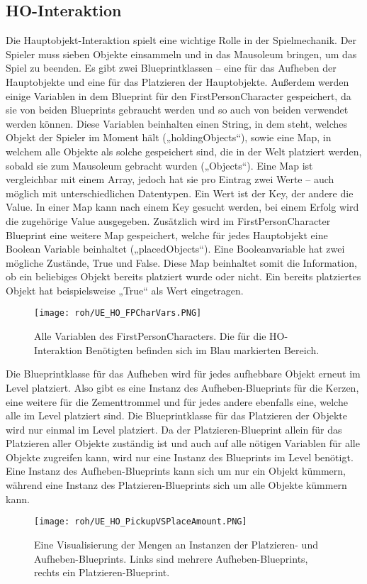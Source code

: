 \subsection{HO-Interaktion}
Die Hauptobjekt-Interaktion spielt eine wichtige Rolle in der Spielmechanik. Der Spieler muss sieben Objekte einsammeln und in das Mausoleum bringen, um das Spiel zu beenden.
Es gibt zwei Blueprintklassen – eine für das Aufheben der Hauptobjekte und eine für das Platzieren der Hauptobjekte. Außerdem werden einige Variablen in dem Blueprint für den FirstPersonCharacter gespeichert, da sie von beiden Blueprints gebraucht werden und so auch von beiden verwendet werden können. Diese Variablen beinhalten einen String, in dem steht, welches Objekt der Spieler im Moment hält („holdingObjects“), sowie eine Map, in welchem alle Objekte als solche gespeichert sind, die in der Welt platziert werden, sobald sie zum Mausoleum gebracht wurden („Objects“). Eine Map ist vergleichbar mit einem Array, jedoch hat sie pro Eintrag zwei Werte – auch möglich mit unterschiedlichen Datentypen. Ein Wert ist der Key, der andere die Value. In einer Map kann nach einem Key gesucht werden, bei einem Erfolg wird die zugehörige Value ausgegeben.
Zusätzlich wird im FirstPersonCharacter Blueprint eine weitere Map gespeichert, welche für jedes Hauptobjekt eine Boolean Variable beinhaltet („placedObjects“). Eine Booleanvariable hat zwei mögliche Zustände, True und False. Diese Map beinhaltet somit die Information, ob ein beliebiges Objekt bereits platziert wurde oder nicht. Ein bereits platziertes Objekt hat beispielsweise „True“ als Wert eingetragen.
\begin{figure}[H]
    \centering
    \texttt{[image: roh/UE\_HO\_FPCharVars.PNG]}
    \caption{Alle Variablen des FirstPersonCharacters. Die für die HO-Interaktion Benötigten befinden sich im Blau markierten Bereich.}
    \label{UE:HO_FPCharVars}
\end{figure}
Die Blueprintklasse für das Aufheben wird für jedes aufhebbare Objekt erneut im Level platziert. Also gibt es eine Instanz des Aufheben-Blueprints für die Kerzen, eine weitere für die Zementtrommel und für jedes andere ebenfalls eine, welche alle im Level platziert sind.
Die Blueprintklasse für das Platzieren der Objekte wird nur einmal im Level platziert. Da der Platzieren-Blueprint allein für das Platzieren aller Objekte zuständig ist und auch auf alle nötigen Variablen für alle Objekte zugreifen kann, wird nur eine Instanz des Blueprints im Level benötigt.
Eine Instanz des Aufheben-Blueprints kann sich um nur ein Objekt kümmern, während eine Instanz des Platzieren-Blueprints sich um alle Objekte kümmern kann.
\begin{figure}[H]
    \centering
    \texttt{[image: roh/UE\_HO\_PickupVSPlaceAmount.PNG]}
    \caption{Eine Visualisierung der Mengen an Instanzen der Platzieren- und Aufheben-Blueprints. Links sind mehrere Aufheben-Blueprints, rechts ein Platzieren-Blueprint.}
    \label{UE:HO_PickupVSPlaceAmount}
\end{figure}
